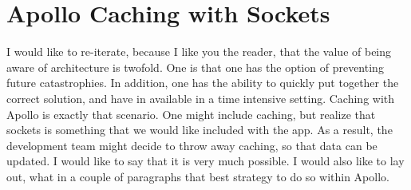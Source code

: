 \maketitle{}
\section{ Apollo Caching with Sockets }

I would like to re-iterate, because I like you the reader, that the value of
being aware of architecture is twofold. One is that one has the option of
preventing future catastrophies. In addition, one has the ability to quickly
put together the correct solution, and have in available in a time intensive
setting. Caching with Apollo is exactly that scenario. One might include
caching, but realize that sockets is something that we would like included with
the app. As a result, the development team might decide to throw away caching,
so that data can be updated. I would like to say that it is very much possible.
I would also like to lay out, what in a couple of paragraphs that best strategy
to do so within Apollo.
